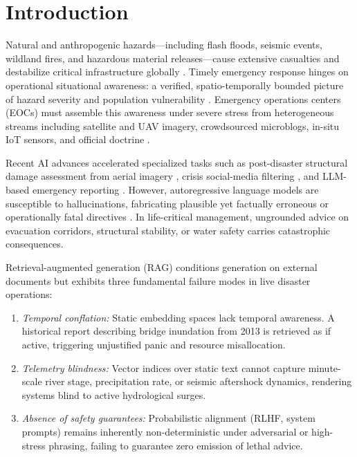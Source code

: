 \documentclass[conference]{IEEEtran}
\begin{document}
\section{Introduction}
Natural and anthropogenic hazards---including flash floods, seismic events, wildland fires, and hazardous material releases---cause extensive casualties and destabilize critical infrastructure globally \cite{undrr}. Timely emergency response hinges on operational situational awareness: a verified, spatio-temporally bounded picture of hazard severity and population vulnerability \cite{comes,adams,endsley}. Emergency operations centers (EOCs) must assemble this awareness under severe stress from heterogeneous streams including satellite and UAV imagery, crowdsourced microblogs, in-situ IoT sensors, and official doctrine \cite{crisismmd,ofli}.

Recent AI advances accelerated specialized tasks such as post-disaster structural damage assessment from aerial imagery \cite{singh}, crisis social-media filtering \cite{dinani,olteanu2015}, and LLM-based emergency reporting \cite{cantini}. However, autoregressive language models are susceptible to hallucinations, fabricating plausible yet factually erroneous or operationally fatal directives \cite{ji,yu2024}. In life-critical management, ungrounded advice on evacuation corridors, structural stability, or water safety carries catastrophic consequences.

Retrieval-augmented generation (RAG) \cite{lewis} conditions generation on external documents but exhibits three fundamental failure modes in live disaster operations:
\begin{enumerate}
    \item \textit{Temporal conflation:} Static embedding spaces lack temporal awareness. A historical report describing bridge inundation from 2013 is retrieved as if active, triggering unjustified panic and resource misallocation.
    \item \textit{Telemetry blindness:} Vector indices over static text cannot capture minute-scale river stage, precipitation rate, or seismic aftershock dynamics, rendering systems blind to active hydrological surges.
    \item \textit{Absence of safety guarantees:} Probabilistic alignment (RLHF, system prompts) remains inherently non-deterministic under adversarial or high-stress phrasing, failing to guarantee zero emission of lethal advice.
\end{enumerate}
\end{document}
